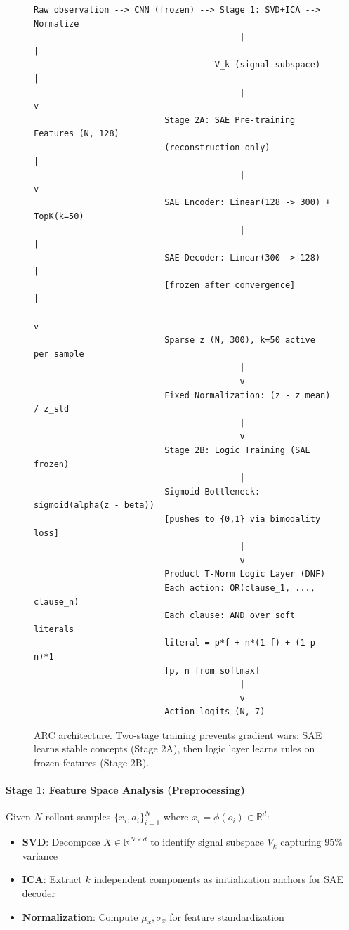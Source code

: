 \documentclass[11pt,twocolumn]{article}
\begin{document}
\begin{figure}
\centering
\small
\begin{verbatim}
Raw observation --> CNN (frozen) --> Stage 1: SVD+ICA --> Normalize
                                         |                    |
                                    V_k (signal subspace)     |
                                         |                    v
                          Stage 2A: SAE Pre-training    Features (N, 128)
                          (reconstruction only)              |
                                         |                    v
                          SAE Encoder: Linear(128 -> 300) + TopK(k=50)
                                         |                    |
                          SAE Decoder: Linear(300 -> 128)    |
                          [frozen after convergence]          |
                                                              v
                          Sparse z (N, 300), k=50 active per sample
                                         |
                                         v
                          Fixed Normalization: (z - z_mean) / z_std
                                         |
                                         v
                          Stage 2B: Logic Training (SAE frozen)
                                         |
                          Sigmoid Bottleneck: sigmoid(alpha(z - beta))
                          [pushes to {0,1} via bimodality loss]
                                         |
                                         v
                          Product T-Norm Logic Layer (DNF)
                          Each action: OR(clause_1, ..., clause_n)
                          Each clause: AND over soft literals
                          literal = p*f + n*(1-f) + (1-p-n)*1
                          [p, n from softmax]
                                         |
                                         v
                          Action logits (N, 7)
\end{verbatim}
\caption{ARC architecture. Two-stage training prevents gradient wars: SAE learns stable concepts (Stage 2A), then logic layer learns rules on frozen features (Stage 2B).}
\label{fig:architecture}
\end{figure}

\paragraph{Stage 1: Feature Space Analysis (Preprocessing)}
Given $N$ rollout samples $\{x_i, a_i\}_{i=1}^N$ where $x_i = \phi(o_i) \in \mathbb{R}^d$:
\begin{itemize}
\item \textbf{SVD}: Decompose $X \in \mathbb{R}^{N \times d}$ to identify signal subspace $V_k$ capturing 95\% variance
\item \textbf{ICA}: Extract $k$ independent components as initialization anchors for SAE decoder
\item \textbf{Normalization}: Compute $\mu_x, \sigma_x$ for feature standardization
\end{itemize}
\end{document}

